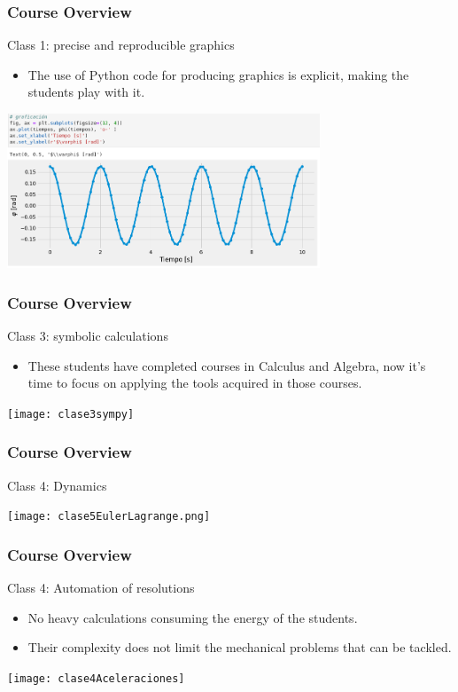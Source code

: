 \documentclass[aspectratio=169]{beamer}
\begin{document}
\begin{frame}
	\frametitle{Course Overview}
	Class 1: precise and reproducible graphics
	\begin{block}{}
		\begin{itemize}
			\item The use of Python code for producing graphics is explicit, making the students play with it.
		\end{itemize}
	\includegraphics[width= 0.7\textwidth]{clase1gráficos}
	\end{block}
\end{frame}

\begin{frame}
	\frametitle{Course Overview}
	Class 3: symbolic calculations
	\begin{block}{}
		\begin{itemize}
			\item These students have completed courses in Calculus and Algebra, now it's time to focus on applying the tools acquired in those courses.
		\end{itemize}
	\texttt{[image: clase3sympy]}
	\end{block}
\end{frame}

\begin{frame}
	\frametitle{Course Overview}
	Class 4: Dynamics
	\begin{block}{}
	\texttt{[image: clase5EulerLagrange.png]}
	\end{block}
\end{frame}

\begin{frame}
	\frametitle{Course Overview}
	Class 4: Automation of resolutions
	\begin{block}{}
		\begin{itemize}
			\item No heavy calculations consuming the energy of the students.
			\item Their complexity does not limit the mechanical problems that can be tackled.
		\end{itemize}
	\texttt{[image: clase4Aceleraciones]}
	\end{block}
\end{frame}
\end{document}
